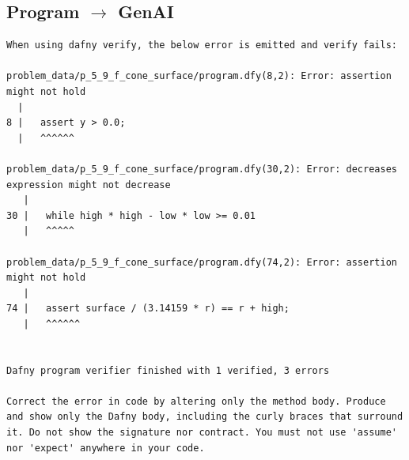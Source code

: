 \documentclass{article}
\begin{document}
\subsection*{Program $\rightarrow$ GenAI}
\begin{lstlisting}
When using dafny verify, the below error is emitted and verify fails:

problem_data/p_5_9_f_cone_surface/program.dfy(8,2): Error: assertion might not hold
  |
8 |   assert y > 0.0;
  |   ^^^^^^

problem_data/p_5_9_f_cone_surface/program.dfy(30,2): Error: decreases expression might not decrease
   |
30 |   while high * high - low * low >= 0.01
   |   ^^^^^

problem_data/p_5_9_f_cone_surface/program.dfy(74,2): Error: assertion might not hold
   |
74 |   assert surface / (3.14159 * r) == r + high;
   |   ^^^^^^


Dafny program verifier finished with 1 verified, 3 errors

Correct the error in code by altering only the method body. Produce and show only the Dafny body, including the curly braces that surround it. Do not show the signature nor contract. You must not use 'assume' nor 'expect' anywhere in your code.
\end{lstlisting}
\end{document}
